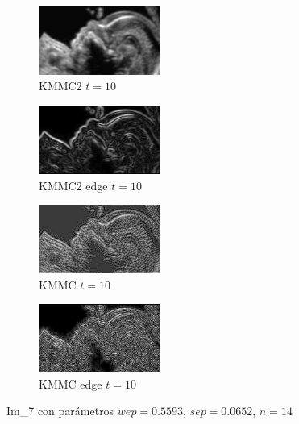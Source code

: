 \documentclass[a4paper,10pt,twocolumn]{article}
\begin{document}
\begin{center}
\begin{figure}[!htb]
		\begin{subfigure}[h!]{4cm}
			\includegraphics[width=4cm]{image/im7/im_7_10}
			\caption{KMMC2 $t = 10$}
		\end{subfigure}
		\begin{subfigure}[i!]{4cm}
			\includegraphics[width=4cm]{image/im7/im_7_10_edge}
			\caption{KMMC2 edge $t = 10$}
		\end{subfigure}
		\begin{subfigure}[j!]{4cm}
			\includegraphics[width=4cm]{image/im7/im_7_10_norm}
			\caption{KMMC $t = 10$}
		\end{subfigure}
		\begin{subfigure}[k!]{4cm}
			\includegraphics[width=4cm]{image/im7/im_7_10_norm_edge}
			\caption{KMMC edge $t = 10$}
		\end{subfigure}
		
		\caption{Im\_7 con par\'ametros $wep = 0.5593$, $sep = 0.0652$, $n = 14$}
	\end{figure}
\end{center}

\newpage
\end{document}
